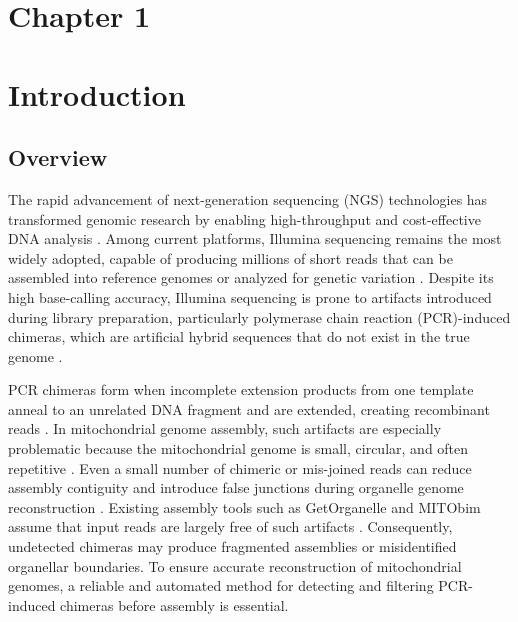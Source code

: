 \section*{Chapter 1}\label{sec:researchdesc}

\section{Introduction}

\subsection{Overview}\label{subsec:overview}

The rapid advancement of next-generation sequencing (NGS) technologies has transformed genomic research by enabling high-throughput and cost-effective DNA analysis \citep{Metzker2010}. Among current platforms, Illumina sequencing remains the most widely adopted, capable of producing millions of short reads that can be assembled into reference genomes or analyzed for genetic variation \citep{Bentley2008,Glenn2011}. Despite its high base-calling accuracy, Illumina sequencing is prone to artifacts introduced during library preparation, particularly polymerase chain reaction (PCR)-induced chimeras, which are artificial hybrid sequences that do not exist in the true genome \citep{Judo1998}.

PCR chimeras form when incomplete extension products from one template anneal to an unrelated DNA fragment and are extended, creating recombinant reads \citep{Qiu2001}. In mitochondrial genome assembly, such artifacts are especially problematic because the mitochondrial genome is small, circular, and often repetitive \citep{Boore1999,Cameron2014}. Even a small number of chimeric or mis-joined reads can reduce assembly contiguity and introduce false junctions during organelle genome reconstruction \citep{Hahn2013,Dierckxsens2017,Jin2020}. Existing assembly tools such as GetOrganelle and MITObim assume that input reads are largely free of such artifacts \citep{Hahn2013,Jin2020}. Consequently, undetected chimeras may produce fragmented assemblies or misidentified organellar boundaries. To ensure accurate reconstruction of mitochondrial genomes, a reliable and automated method for detecting and filtering PCR-induced chimeras before assembly is essential.

